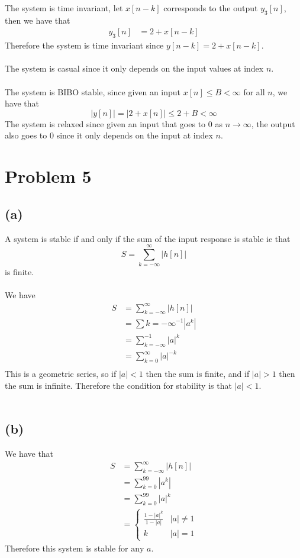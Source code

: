The system is time invariant, let $x[n-k]$ corresponds to the output $y_3[n]$, then we have that
\begin{align*}
    y_3[n]&=2+x[n-k]
\end{align*}
Therefore the system is time invariant since $y[n-k]=2+x[n-k]$.\\\\
The system is casual since it only depends on the input values at index $n$.\\\\
The system is BIBO stable, since given an input $x[n]\leq B<\infty$ for all $n$, we have that
$$|y[n]|=|2+x[n]|\leq 2+B < \infty$$
The system is relaxed since given an input that goes to $0$ as $n\to\infty$, the output
also goes to $0$ since it only depends on the input at index $n$.
\section*{Problem 5}
\subsection*{(a)}
A system is stable if and only if the sum of the input response is stable
ie that 
$$S=\sum_{k=-\infty}^{\infty}|h[n]|$$
is finite.\\\\
We have
\begin{align*}
    S&=\sum_{k=-\infty}^{\infty}|h[n]|\\
    &=\sum{k=-\infty}^{-1}\left|a^k\right|\\
    &=\sum_{k=-\infty}^{-1}|a|^k\\
    &=\sum_{k=0}^{\infty}|a|^{-k}\\
\end{align*}
This is a geometric series, so if $|a|<1$ then the sum is finite, and if $|a|>1$ then the sum is infinite. Therefore
the condition for stability is that $\boxed{|a|<1}$.\\\\
\subsection*{(b)}
We have that
\begin{align*}
    S&=\sum_{k=-\infty}^{\infty}|h[n]|\\
    &=\sum_{k=0}^{99}\left|a^k\right|\\
    &=\sum_{k=0}^{99}|a|^k\\
    &=\begin{cases}
        \frac{1-|a|^k}{1-|a|} & |a|\neq1\\
        k & |a|=1
    \end{cases}
\end{align*}
Therefore this system is stable for $\boxed{\text{any }a}$.
